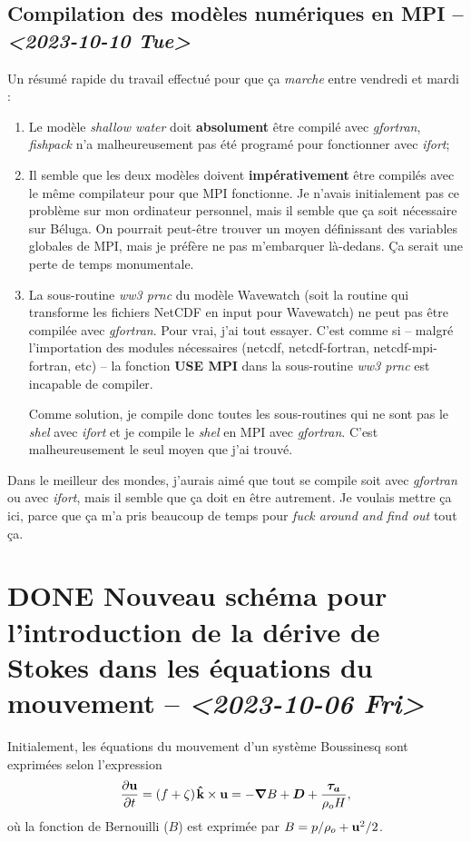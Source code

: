 \documentclass[10pt]{article}
\numberwithin{equation}{section}
\newcommand{\kvf}{\vb{\hat{k}}}
\newcommand{\uu}{\vb{u}}
\newcommand{\pt}{\hspace{1pt}} %
\begin{document}
\subsection{Compilation des modèles numériques en MPI -- \textit{<2023-10-10 Tue>}}
\label{sec:orgc0811a7}
Un résumé rapide du travail effectué pour que ça \emph{marche} entre vendredi et mardi : \bigskip
\begin{enumerate}
\item Le modèle \emph{shallow water} doit \textbf{absolument} être compilé avec \emph{gfortran}, \emph{fishpack} n'a malheureusement pas été programé pour fonctionner avec \emph{ifort};\bigskip
\item Il semble que les deux modèles doivent \textbf{impérativement} être compilés avec le même compilateur pour que MPI fonctionne.
Je n'avais initialement pas ce problème sur mon ordinateur personnel, mais il semble que ça soit nécessaire sur Béluga.
On pourrait peut-être trouver un moyen définissant des variables globales de MPI, mais je préfère ne pas m'embarquer là-dedans. Ça serait une perte de temps monumentale.\bigskip
\item La sous-routine \emph{ww3 prnc} du modèle Wavewatch (soit la routine qui transforme les fichiers NetCDF en input pour Wavewatch) ne peut pas être compilée avec \emph{gfortran}. Pour vrai, j'ai tout essayer.
C'est comme si -- malgré l'importation des modules nécessaires (netcdf, netcdf-fortran, netcdf-mpi-fortran, etc) -- la fonction \textbf{USE MPI} dans la sous-routine \emph{ww3 prnc} est incapable de compiler.\bigskip

Comme solution, je compile donc toutes les sous-routines qui ne sont pas le \emph{shel} avec \emph{ifort} et je compile le \emph{shel} en MPI avec \emph{gfortran}.
C'est malheureusement le seul moyen que j'ai trouvé.\bigskip
\end{enumerate}

Dans le meilleur des mondes, j'aurais aimé que tout se compile soit avec \emph{gfortran} ou avec \emph{ifort}, mais il semble que ça doit en être autrement.
Je voulais mettre ça ici, parce que ça m'a pris beaucoup de temps pour \emph{fuck around and find out} tout ça.


\section{{\bfseries\sffamily DONE} Nouveau schéma pour l'introduction de la dérive de Stokes dans les équations du mouvement -- \textit{<2023-10-06 Fri>}}
\label{sec:org92b92c6}
Initialement, les équations du mouvement d'un système Boussinesq sont exprimées selon l'expression
\begin{equation}
\label{eq:orgc319734}
   \pdv{\uu}{t} = \qty(f+\zeta)\pt \kvf\times\uu = -\gradient{B} + \boldsymbol{D} + \frac{\boldsymbol{\tau_a}}{\rho_o H},
\end{equation}
où la fonction de Bernouilli (\(B\)) est exprimée par \(B = p/\rho_o + \uu^2/2\).\bigskip
\end{document}
